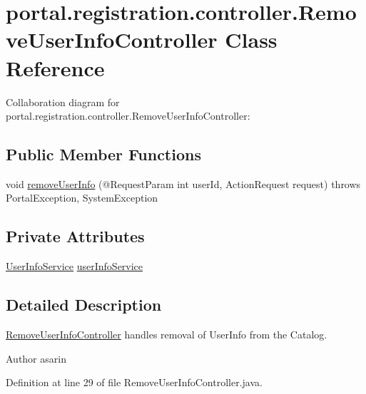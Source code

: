 \hypertarget{classportal_1_1registration_1_1controller_1_1RemoveUserInfoController}{
\section{portal.registration.controller.RemoveUserInfoController Class Reference}
\label{classportal_1_1registration_1_1controller_1_1RemoveUserInfoController}
}


Collaboration diagram for portal.registration.controller.RemoveUserInfoController:
\subsection*{Public Member Functions}
\begin{DoxyCompactItemize}
\item 
void \hyperlink{classportal_1_1registration_1_1controller_1_1RemoveUserInfoController_a7bb13ed82ea190f5c33820b30876c33f}{removeUserInfo} (@RequestParam int userId, ActionRequest request)  throws PortalException, SystemException 
\end{DoxyCompactItemize}
\subsection*{Private Attributes}
\begin{DoxyCompactItemize}
\item 
\hyperlink{interfaceportal_1_1registration_1_1services_1_1UserInfoService}{UserInfoService} \hyperlink{classportal_1_1registration_1_1controller_1_1RemoveUserInfoController_aa47f9e167dfc7634fd39928b21c05390}{userInfoService}
\end{DoxyCompactItemize}


\subsection{Detailed Description}
\hyperlink{classportal_1_1registration_1_1controller_1_1RemoveUserInfoController}{RemoveUserInfoController} handles removal of UserInfo from the Catalog.

\begin{DoxyAuthor}{Author}
asarin 
\end{DoxyAuthor}


Definition at line 29 of file RemoveUserInfoController.java.




